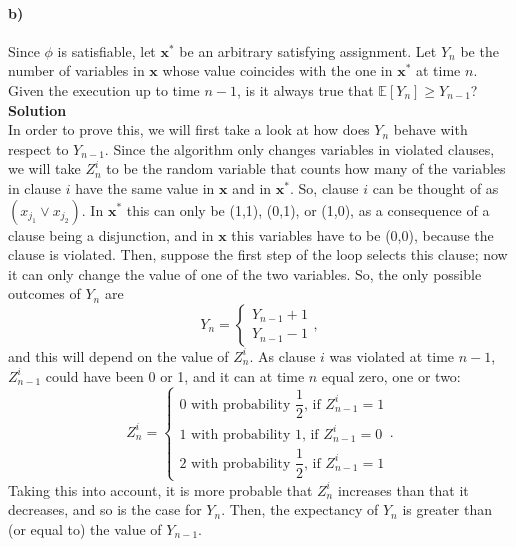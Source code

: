 \documentclass[10pt]{article}
\begin{document}
\paragraph{b)} Since $\phi$ is satisfiable, let $\textbf{x}^*$ be an arbitrary satisfying assignment. Let $Y_n$ be the number of variables in $\textbf{x}$ whose value coincides with the one in $\textbf{x}^*$ at time $n$. Given the execution up to time $n-1$, is it always true that $\mathbb{E}\left[Y_n\right]\geq Y_{n-1}$?\\
\textbf{Solution}\\
In order to prove this, we will first take a look at how does $Y_n$ behave with respect to $Y_{n-1}$. Since the algorithm only changes variables in violated clauses, we will take $Z^i_n$ to be the random variable that counts how many of the variables in clause $i$ have the same value in $\textbf{x}$ and in $\textbf{x}^*$. So, clause $i$ can be thought of as $(x_{j_1}\vee x_{j_2})$. In $\textbf{x}^*$ this can only be (1,1), (0,1), or (1,0), as a consequence of a clause being a disjunction, and in $\textbf{x}$ this variables have to be (0,0), because the clause is violated. Then, suppose the first step of the loop selects this clause; now it can only change the value of one of the two variables. So, the only possible outcomes of $Y_n$ are 
\[
Y_n=\begin{cases}
Y_{n-1}+1\\
Y_{n-1}-1
\end{cases},
\] and this will depend on the value of $Z^i_n$. As clause $i$ was violated at time $n-1$, $Z^i_{n-1}$ could have been 0 or 1, and it can at time $n$ equal zero, one or two:
\[
Z^i_n=\begin{cases}
0\text{ with probability }\dfrac{1}{2}\text{, if }Z^i_{n-1}=1\\
1\text{ with probability 1, if }Z^i_{n-1}=0\\
2\text{ with probability }\dfrac{1}{2}\text{, if }Z^i_{n-1}=1
\end{cases}.
\] Taking this into account, it is more probable that $Z^i_n$ increases than that it decreases, and so is the case for $Y_n$. Then, the expectancy of $Y_n$ is greater than (or equal to) the value of $Y_{n-1}$.
\newpage
\end{document}
